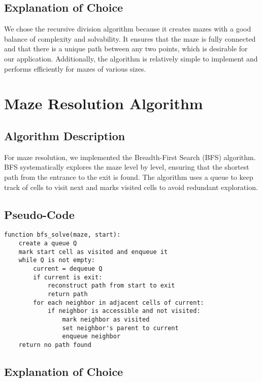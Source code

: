 \documentclass{article}
\begin{document}
\subsection*{Explanation of Choice}

We chose the recursive division algorithm because it creates mazes with a good balance of complexity and solvability. It ensures that the maze is fully connected and that there is a unique path between any two points, which is desirable for our application. Additionally, the algorithm is relatively simple to implement and performs efficiently for mazes of various sizes.

\section*{Maze Resolution Algorithm}

\subsection*{Algorithm Description}

For maze resolution, we implemented the Breadth-First Search (BFS) algorithm. BFS systematically explores the maze level by level, ensuring that the shortest path from the entrance to the exit is found. The algorithm uses a queue to keep track of cells to visit next and marks visited cells to avoid redundant exploration.

\subsection*{Pseudo-Code}

\begin{verbatim}
function bfs_solve(maze, start):
    create a queue Q
    mark start cell as visited and enqueue it
    while Q is not empty:
        current = dequeue Q
        if current is exit:
            reconstruct path from start to exit
            return path
        for each neighbor in adjacent cells of current:
            if neighbor is accessible and not visited:
                mark neighbor as visited
                set neighbor's parent to current
                enqueue neighbor
    return no path found
\end{verbatim}

\subsection*{Explanation of Choice}
\end{document}
